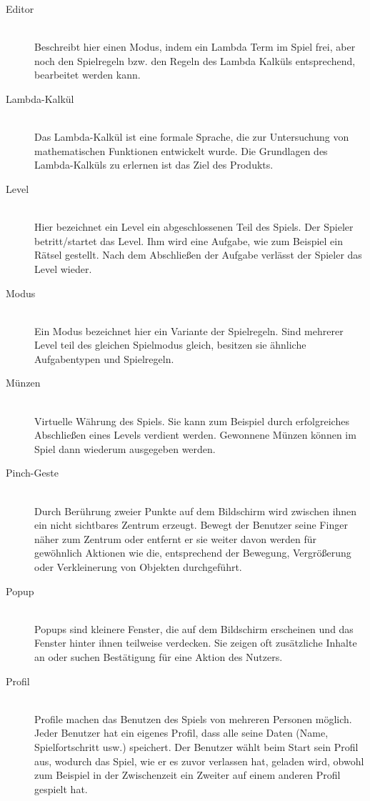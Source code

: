 \begin{description}
	\item[Editor] \hfill \\
	Beschreibt hier einen Modus, indem ein Lambda Term im Spiel frei, aber noch den Spielregeln bzw. den Regeln des Lambda Kalküls
	entsprechend, bearbeitet werden kann.
	
	\item[Lambda-Kalkül] \hfill \\
	Das Lambda-Kalkül ist eine formale Sprache, die zur Untersuchung von mathematischen Funktionen entwickelt wurde.
	Die Grundlagen des Lambda-Kalküls zu erlernen ist das Ziel des Produkts.
	
	\item[Level] \hfill \\
	Hier bezeichnet ein Level ein abgeschlossenen Teil des Spiels. Der Spieler betritt/startet das Level. Ihm wird eine Aufgabe,
	wie zum Beispiel ein Rätsel gestellt. Nach dem Abschließen der Aufgabe verlässt der Spieler das Level wieder.
	
	\item[Modus] \hfill \\
	Ein Modus bezeichnet hier ein Variante der Spielregeln. Sind mehrerer Level teil des gleichen Spielmodus gleich, 
	besitzen sie ähnliche Aufgabentypen und Spielregeln.
	
	\item[Münzen] \hfill \\
	Virtuelle Währung des Spiels. Sie kann zum Beispiel durch erfolgreiches Abschließen eines Levels verdient werden.
	Gewonnene Münzen können im Spiel dann wiederum ausgegeben werden.
	
	\item[Pinch-Geste] \hfill \\
	Durch Berührung zweier Punkte auf dem Bildschirm wird zwischen ihnen ein nicht sichtbares Zentrum erzeugt.
	Bewegt der Benutzer seine Finger näher zum Zentrum oder entfernt er sie weiter davon werden für gewöhnlich
	Aktionen wie die, entsprechend der Bewegung, Vergrößerung oder Verkleinerung von Objekten durchgeführt.
	
	\item[Popup] \hfill \\
	Popups sind kleinere Fenster, die auf dem Bildschirm erscheinen und das Fenster hinter ihnen teilweise verdecken.
	Sie zeigen oft zusätzliche Inhalte an oder suchen Bestätigung für eine Aktion des Nutzers.
	
	\item[Profil] \hfill \\
	Profile machen das Benutzen des Spiels von mehreren Personen möglich. Jeder Benutzer hat ein eigenes Profil,
	dass alle seine Daten (Name, Spielfortschritt usw.) speichert. Der Benutzer wählt beim Start sein Profil aus, wodurch das Spiel,
	wie er es zuvor verlassen hat, geladen wird, obwohl zum Beispiel in der Zwischenzeit ein Zweiter auf einem anderen Profil gespielt hat.
	

\end{description}
